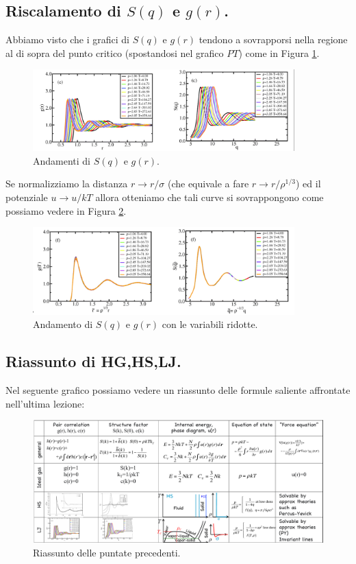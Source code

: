 \subsection{Riscalamento di $S(q)$ e $g(r)$.}
\label{subsec:Riscalamento di $S(q)$ e $g(r)$.}
Abbiamo visto che i grafici di $S(q)$ e $g(r)$ tendono a sovrapporsi nella regione al di sopra del punto critico (spostandosi nel grafico $PT$) come in Figura \ref{fig:figures-grafici-shiftati-png}.\\
\begin{figure}[H]
	\centering
	\includegraphics[width=0.9\textwidth]{figures/grafici-shiftati.png}
	\caption{Andamenti di $S(q)$ e $g(r)$.}
	\label{fig:figures-grafici-shiftati-png}
\end{figure}
Se normalizziamo la distanza $r\to r/\sigma$ (che equivale a fare $r\to r/\rho^{1/3}$) ed il potenziale $u\to u/kT$ allora otteniamo che tali curve si sovrappongono come possiamo vedere in Figura \ref{fig:reduced-Sg}.
\begin{figure}[H]
	\centering
	\includegraphics[width=0.9\textwidth]{figures/grafici-sovrapposti.png}
	\caption{Andamento di $S(q)$ e $g(r)$ con le variabili ridotte.}
	\label{fig:reduced-Sg}
\end{figure}
\subsection{Riassunto di HG,HS,LJ.}
\label{subsec:Riassunto di HG,HS,LJ.}
Nel seguente grafico possiamo vedere un riassunto delle formule saliente affrontate nell'ultima lezione:
\begin{figure}[H]
	\centering
	\includegraphics[width=1\textwidth]{figures/riassuntone-lez3-emezzo.png}
	\caption{Riassunto delle puntate precedenti.}
	\label{fig:figures-riassuntone-lez3-emezzo-png}
\end{figure}
